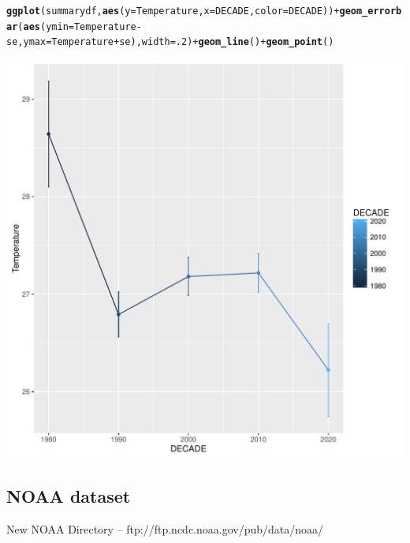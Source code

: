 \documentclass{article}\usepackage[]{graphicx}\usepackage[]{color}
\makeatletter
\def\maxwidth{ %
  \ifdim\Gin@nat@width>\linewidth
    \linewidth
  \else
    \Gin@nat@width
  \fi
}
\newcommand{\hlnum}[1]{\textcolor[rgb]{0.686,0.059,0.569}{#1}}%
\newcommand{\hlopt}[1]{\textcolor[rgb]{0,0,0}{#1}}%
\newcommand{\hlstd}[1]{\textcolor[rgb]{0.345,0.345,0.345}{#1}}%
\newcommand{\hlkwc}[1]{\textcolor[rgb]{0.333,0.667,0.333}{#1}}%
\newcommand{\hlkwd}[1]{\textcolor[rgb]{0.737,0.353,0.396}{\textbf{#1}}}%
\newenvironment{kframe}{%
 \def\at@end@of@kframe{}%
 \ifinner\ifhmode%
  \def\at@end@of@kframe{\end{minipage}}%
  \begin{minipage}{\columnwidth}%
 \fi\fi%
 \def\FrameCommand##1{\hskip\@totalleftmargin \hskip-\fboxsep
 \colorbox{shadecolor}{##1}\hskip-\fboxsep
     \hskip-\linewidth \hskip-\@totalleftmargin \hskip\columnwidth}%
 \MakeFramed {\advance\hsize-\width
   \@totalleftmargin\z@ \linewidth\hsize
   \@setminipage}}%
 {\par\unskip\endMakeFramed%
 \at@end@of@kframe}
\newenvironment{knitrout}{}{} %
\makeatother
\begin{document}
\begin{knitrout}
\begin{kframe}
{\ttfamily\noindent\bfseries\color{errorcolor}{\#\# Error in +geom\_point(): invalid argument to unary operator}}\begin{alltt}
\hlkwd{ggplot}\hlstd{(summarydf,} \hlkwd{aes}\hlstd{(}\hlkwc{y}\hlstd{=Temperature,} \hlkwc{x}\hlstd{=DECADE,} \hlkwc{color}\hlstd{= DECADE))} \hlopt{+} \hlkwd{geom_errorbar}\hlstd{(}\hlkwd{aes}\hlstd{(}\hlkwc{ymin}\hlstd{=Temperature}\hlopt{-}\hlstd{se,} \hlkwc{ymax}\hlstd{=Temperature}\hlopt{+}\hlstd{se),} \hlkwc{width}\hlstd{=}\hlnum{.2}\hlstd{)} \hlopt{+} \hlkwd{geom_line}\hlstd{()} \hlopt{+} \hlkwd{geom_point}\hlstd{()}
\end{alltt}
\end{kframe}
\includegraphics[width=\maxwidth]{figure/unnamed-chunk-6-2} 

\end{knitrout}




\subsection{NOAA dataset}

New NOAA Directory -- ftp://ftp.ncdc.noaa.gov/pub/data/noaa/
\end{document}
